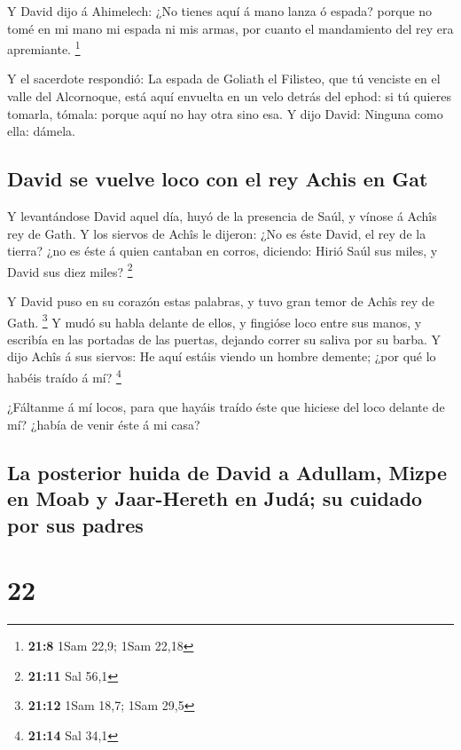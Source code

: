  Y David dijo á Ahimelech: ¿No tienes aquí á mano lanza ó
espada? porque no tomé en mi mano mi espada ni mis armas, por cuanto el
mandamiento del rey era apremiante. \footnote{\textbf{21:8} 1Sam 22,9;
  1Sam 22,18}

 Y el sacerdote respondió: La espada de Goliath el Filisteo,
que tú venciste en el valle del Alcornoque, está aquí envuelta en un
velo detrás del ephod: si tú quieres tomarla, tómala: porque aquí no hay
otra sino esa. Y dijo David: Ninguna como ella: dámela.

\hypertarget{david-se-vuelve-loco-con-el-rey-achis-en-gat}{%
\subsection{David se vuelve loco con el rey Achis en
Gat}\label{david-se-vuelve-loco-con-el-rey-achis-en-gat}}

 Y levantándose David aquel día, huyó de la presencia de
Saúl, y vínose á Achîs rey de Gath.  Y los siervos de Achîs
le dijeron: ¿No es éste David, el rey de la tierra? ¿no es éste á quien
cantaban en corros, diciendo: Hirió Saúl sus miles, y David sus diez
miles? \footnote{\textbf{21:11} Sal 56,1}

 Y David puso en su corazón estas palabras, y tuvo gran
temor de Achîs rey de Gath. \footnote{\textbf{21:12} 1Sam 18,7; 1Sam
  29,5}  Y mudó su habla delante de ellos, y fingióse loco
entre sus manos, y escribía en las portadas de las puertas, dejando
correr su saliva por su barba.  Y dijo Achîs á sus siervos:
He aquí estáis viendo un hombre demente; ¿por qué lo habéis traído á mí?
\footnote{\textbf{21:14} Sal 34,1}

 ¿Fáltanme á mí locos, para que hayáis traído éste que
hiciese del loco delante de mí? ¿había de venir éste á mi casa?

\hypertarget{la-posterior-huida-de-david-a-adullam-mizpe-en-moab-y-jaar-hereth-en-juduxe1-su-cuidado-por-sus-padres}{%
\subsection{La posterior huida de David a Adullam, Mizpe en Moab y
Jaar-Hereth en Judá; su cuidado por sus
padres}\label{la-posterior-huida-de-david-a-adullam-mizpe-en-moab-y-jaar-hereth-en-juduxe1-su-cuidado-por-sus-padres}}

\hypertarget{section-21}{%
\section{22}\label{section-21}}

